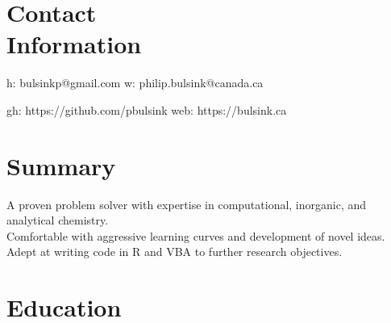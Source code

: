 \documentclass[margin,line]{resumecls}
\begin{document}
\thispagestyle{plain}
\begin{resume}

    \section{%
    \mysidestyle Contact\\Information}\label{sec:mysidestyle-contactinformation}

    h: bulsinkp@gmail.com \hfill w: philip.bulsink@canada.ca\vspace{-4.5mm}

    gh: https://github.com/pbulsink \hfill web: https://bulsink.ca
    \\\vspace{-4.5mm}

    \section{\mysidestyle Summary}\label{sec:mysidestyle-summary}

    A proven problem solver with expertise in computational, inorganic, and analytical chemistry.\\
    Comfortable with aggressive learning curves and development of novel ideas.\\
    Adept at writing code in R and VBA to further research objectives.


    \section{\mysidestyle Education}\label{sec:mysidestyle-education}


\end{resume}
\end{document}

